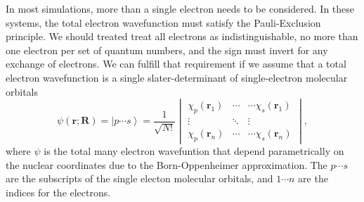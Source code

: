 In most simulations, more than a single electron needs to be considered.
In these systems, the total electron wavefunction must satisfy the Pauli-Exclusion principle.
We should treated treat all electrons as indistinguishable, no more than one electron per set of quantum numbers, and the sign must invert for any exchange of electrons.
We can fulfill that requirement if we assume that a total electron wavefunction is a single slater-determinant of single-electron molecular orbitals
\begin{equation} \label{eq:slater-determinant} \psi(\bm{r};\bm{R}) =
  \left|p \cdots s\right> = \frac{1}{\sqrt{N!}}
  \begin{vmatrix}
    \chi_{p}(\bm{r}_1) & \cdots & \cdots \chi_{s}(\bm{r}_1) \\
    \vdots             & \ddots         &       \vdots      \\
    \chi_{p}(\bm{r}_n) & \cdots & \cdots \chi_{s}(\bm{r}_n)
  \end{vmatrix},
\end{equation}
where \(\psi\) is the total many electron wavefuntion that depend parametrically on the nuclear coordinates due to the Born-Oppenheimer approximation.
The $p \cdots s$ are the subscripts of the single electon molecular orbitals, and $1 \cdots n$ are the indices for the electrons.

